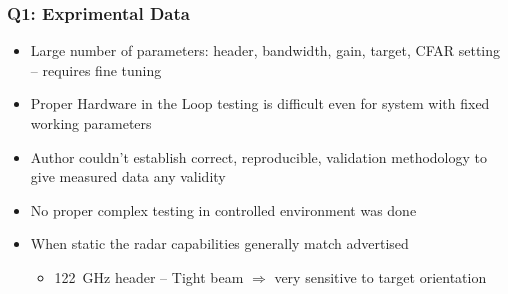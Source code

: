 \documentclass[aspectratio=43]{beamer}
\begin{document}
\begin{frame}[fragile]
  \frametitle{Q1: Exprimental Data}

  \begin{itemize}
    \item Large number of parameters: header, bandwidth, gain, target, CFAR setting -- requires fine tuning
    \item Proper Hardware in the Loop testing is difficult even for system with fixed working parameters
    \item Author couldn't establish correct, reproducible, validation methodology to give measured data any validity
    \item No proper complex testing in controlled environment was done
    \item When static the radar capabilities generally match advertised
      \begin{itemize}
        \item 122~GHz header -- Tight beam $\Rightarrow$ very sensitive to target orientation
      \end{itemize}
  \end{itemize}
\end{frame}
\end{document}
